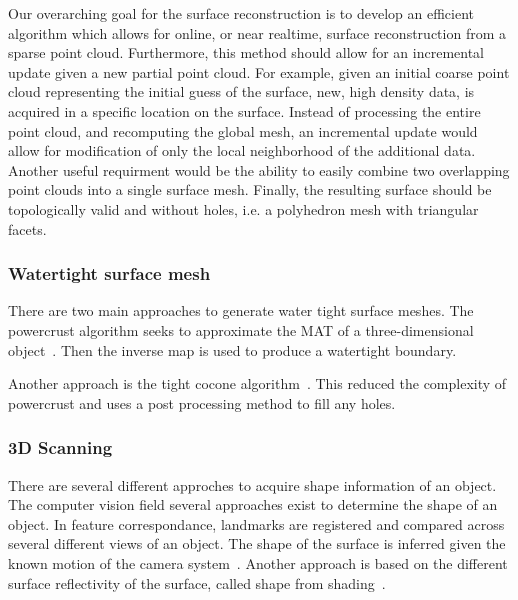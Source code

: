 Our overarching goal for the surface reconstruction is to develop an efficient algorithm which allows for online, or near realtime, surface reconstruction from a sparse point cloud.
Furthermore, this method should allow for an incremental update given a new partial point cloud.
For example, given an initial coarse point cloud representing the initial guess of the surface, new, high density data, is acquired in a specific location on the surface.
Instead of processing the entire point cloud, and recomputing the global mesh, an incremental update would allow for modification of only the local neighborhood of the additional data.
Another useful requirment would be the ability to easily combine two overlapping point clouds into a single surface mesh.
Finally, the resulting surface should be topologically valid and without holes, i.e. a polyhedron mesh with triangular facets.

\subsubsection{Watertight surface mesh}

There are two main approaches to generate water tight surface meshes.
The powercrust algorithm seeks to approximate the \gls{MAT} of a three-dimensional object~\cite{amenta2001}.
Then the inverse map is used to produce a watertight boundary.

Another approach is the tight cocone algorithm~\cite{dey2006}.
This reduced the complexity of powercrust and uses a post processing method to fill any holes.

\subsubsection{3D Scanning}
There are several different approches to acquire shape information of an object.
The computer vision field several approaches exist to determine the shape of an object.
In feature correspondance, landmarks are registered and compared across several different  views of an object. 
The shape of the surface is inferred given the known motion of the camera system~\cite{szeliski2010}.
Another approach is based on the different surface reflectivity of the surface, called shape from shading~\cite{szeliski2010}.


